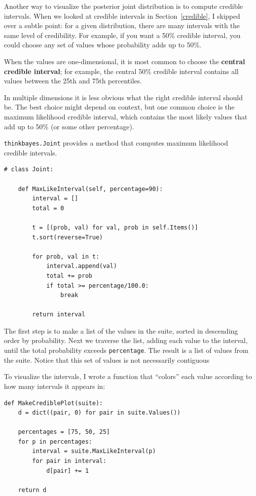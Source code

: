 \documentclass[12pt]{book}
\begin{document}
Another way to visualize the posterior joint distribution is to
compute credible intervals.  When we looked at credible intervals
in Section~\ref{credible},
I skipped over a subtle point: for a given distribution, there
are many intervals with the same level of credibility.  For example,
if you want a 50\% credible interval, you could choose any set of
values whose probability adds up to 50\%.

When the values are one-dimensional, it is most common to choose
the {\bf central credible interval}; for example, the central 50\%
credible interval contains all values between the 25th and 75th
percentiles.

In multiple dimensions it is less obvious what the right credible
interval should be.  The best choice might depend on context, but
one common choice is the maximum likelihood credible interval, which
contains the most likely values that add up to 50\% (or some other
percentage).

{\tt thinkbayes.Joint} provides a method that computes maximum
likelihood credible intervals. 

\begin{verbatim}
# class Joint:

    def MaxLikeInterval(self, percentage=90):
        interval = []
        total = 0

        t = [(prob, val) for val, prob in self.Items()]
        t.sort(reverse=True)

        for prob, val in t:
            interval.append(val)
            total += prob
            if total >= percentage/100.0:
                break

        return interval
\end{verbatim}

The first step is to make a list of the values in the suite,
sorted in descending order by probability.  Next we traverse the
list, adding each value to the interval, until the total
probability exceeds {\tt percentage}.  The result is a list
of values from the suite.  Notice that this set of values
is not necessarily contiguous

To visualize the intervals, I wrote a function that ``colors''
each value according to how many intervals it appears in:

\begin{verbatim}
def MakeCrediblePlot(suite):
    d = dict((pair, 0) for pair in suite.Values())

    percentages = [75, 50, 25]
    for p in percentages:
        interval = suite.MaxLikeInterval(p)
        for pair in interval:
            d[pair] += 1

    return d
\end{verbatim}
\end{document}
